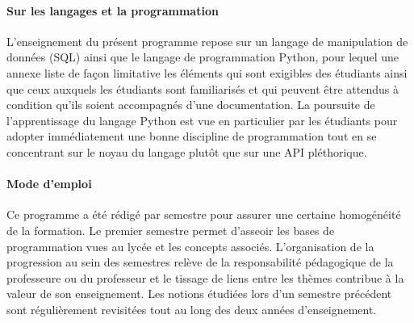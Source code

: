\paragraph{Sur les langages et la programmation} L’enseignement du présent programme repose sur un langage de manipulation de données (SQL) ainsi que le langage de programmation Python, pour lequel une annexe liste de façon limitative les éléments qui sont exigibles des étudiants ainsi que ceux auxquels les étudiants sont familiarisés et qui peuvent être attendus à condition qu’ils soient accompagnés d’une documentation. La poursuite de l’apprentissage du langage Python est vue en particulier par les étudiants pour adopter immédiatement une bonne discipline de programmation tout en se concentrant sur le noyau du langage plutôt que sur une API pléthorique. 

\paragraph{Mode d’emploi} Ce programme a été rédigé par semestre pour assurer une certaine homogénéité de la formation. Le premier semestre permet d’asseoir les bases de programmation vues au lycée et les concepts associés. L’organisation de la progression au sein des semestres relève de la responsabilité pédagogique de la professeure ou du professeur et le tissage de liens entre les thèmes contribue à la valeur de son enseignement. Les notions étudiées lors d’un semestre précédent sont régulièrement revisitées tout au long des deux années d’enseignement. 

